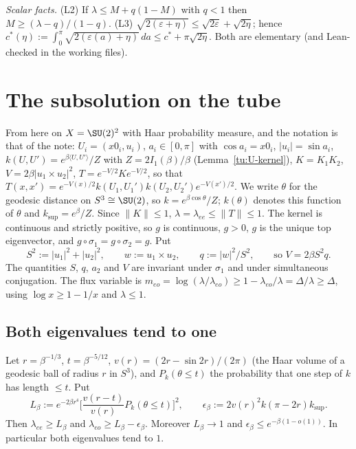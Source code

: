 \noindent\emph{Scalar facts.} (L2) If $\lambda\le M+q(1-M)$ with $q<1$ then $M\ge(\lambda-q)/(1-q)$.
(L3) $\sqrt{2(\varepsilon+\eta)}\le\sqrt{2\varepsilon}+\sqrt{2\eta}$; hence
$c^*(\eta):=\int_0^\pi\sqrt{2(\varepsilon(a)+\eta)}\,da\le c^*+\pi\sqrt{2\eta}$. Both are elementary
(and Lean-checked in the working files).

\section{The subsolution on the tube}\label{tu:L-sec-sub}

From here on $X=\SU(2)^2$ with Haar probability measure, and the notation is that of the note:
$U_i=(x0_i,u_i)$, $a_i\in[0,\pi]$ with $\cos a_i=x0_i$, $|u_i|=\sin a_i$,
$k(U,U')=e^{\beta\langle U,U'\rangle}/Z$ with $Z=2I_1(\beta)/\beta$ (Lemma~\ref{tu:U-kernel}),
$K=K_1K_2$, $V=2\beta|u_1\times u_2|^2$, $T=e^{-V/2}Ke^{-V/2}$, so that
$T(x,x')=e^{-V(x)/2}k(U_1,U_1')k(U_2,U_2')e^{-V(x')/2}$. We write $\theta$ for the geodesic distance
on $S^3\cong\SU(2)$, so $k=e^{\beta\cos\theta}/Z$; $k(\theta)$ denotes this function of $\theta$ and
$k_{\sup}=e^\beta/Z$. Since $\|K\|\le1$, $\lambda=\lambda_{ee}\le\|T\|\le1$. The kernel is continuous
and strictly positive, so $g$ is continuous, $g>0$, $g$ is the unique top eigenvector, and
$g\circ\sigma_1=g\circ\sigma_2=g$. Put
\[
S^2:=|u_1|^2+|u_2|^2,\qquad w:=u_1\times u_2,\qquad q:=|w|^2/S^2,\qquad\text{so } V=2\beta S^2q .
\]
The quantities $S$, $q$, $a_2$ and $V$ are invariant under $\sigma_1$ and under simultaneous
conjugation. The flux variable is $m_{eo}=\log(\lambda/\lambda_{eo})\ge1-\lambda_{eo}/\lambda=\Delta/\lambda\ge\Delta$,
using $\log x\ge1-1/x$ and $\lambda\le1$.

\subsection{Both eigenvalues tend to one}

\begin{lemma}[L4]\label{tu:L-L4}
Let $r=\beta^{-1/3}$, $t=\beta^{-5/12}$, $v(r)=(2r-\sin2r)/(2\pi)$ (the Haar volume of a geodesic
ball of radius $r$ in $S^3$), and $P_k(\theta\le t)$ the probability that one step of $k$ has
length $\le t$. Put
\[
L_\beta:=e^{-2\beta r^4}\Big[\frac{v(r-t)}{v(r)}P_k(\theta\le t)\Big]^2,\qquad
\epsilon_\beta:=2v(r)^2k(\pi-2r)k_{\sup}.
\]
Then $\lambda_{ee}\ge L_\beta$ and $\lambda_{eo}\ge L_\beta-\epsilon_\beta$. Moreover $L_\beta\to1$ and
$\epsilon_\beta\le e^{-\beta(1-o(1))}$. In particular both eigenvalues tend to $1$.
\end{lemma}

